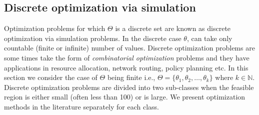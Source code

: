 \subsection{Discrete optimization via simulation}
Optimization problems for which $\Theta$ is a discrete set are known as discrete optimization via simulation problems. In the discrete case $\theta$, can take only countable (finite or infinite) number of values. Discrete optimization problems are some times take the form of \emph{combinatorial optimization} problems and they have applications in resource allocation, network routing, policy planning etc.
In this section we consider the case of $\Theta$ being finite i.e., $\Theta = \{\theta_{1},\theta_{2},\ldots,\theta_{k}\}$ where $k \in \mathbb{N}$. Discrete optimization problems are divided into two sub-classes when the feasible region is  either small (often less than 100) or is large. We present optimization methods in the literature separately for each class.\\
